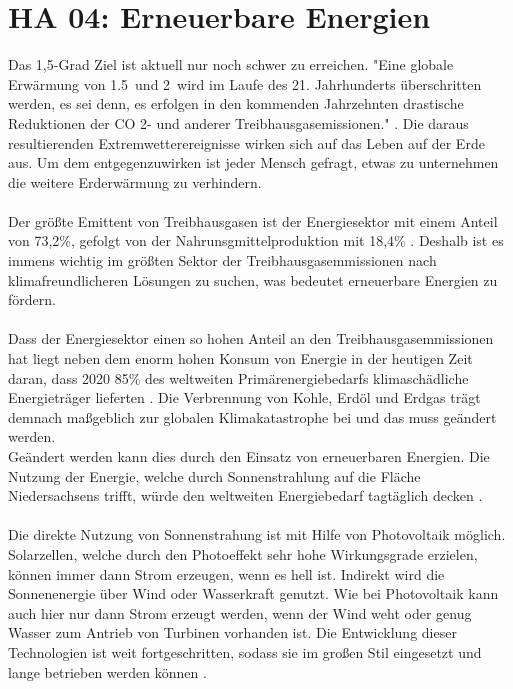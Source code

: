\section{HA 04: Erneuerbare Energien} \label{ha04}
  Das 1,5-Grad Ziel ist aktuell nur noch schwer zu erreichen. "Eine globale Erwärmung von 1.5\textcelsius\ und 2\textcelsius\ wird im Laufe des 21. Jahrhunderts überschritten werden, es sei denn, es erfolgen in den kommenden Jahrzehnten drastische Reduktionen der CO 2- und anderer Treibhausgasemissionen." \cite{ipcc_climate_2021}. Die daraus resultierenden Extremwetterereignisse wirken sich auf das Leben auf der Erde aus. Um dem entgegenzuwirken ist jeder Mensch gefragt, etwas zu unternehmen die weitere Erderwärmung zu verhindern.\\\\
  Der größte Emittent von Treibhausgasen ist der Energiesektor mit einem Anteil von 73,2\%, gefolgt von der Nahrunsgmittelproduktion mit 18,4\% \cite{ritchie_co2_2020}. Deshalb ist es immens wichtig im größten Sektor der Treibhausgasemmissionen nach klimafreundlicheren Lösungen zu suchen, was bedeutet erneuerbare Energien zu fördern.\\\\
  Dass der Energiesektor einen so hohen Anteil an den Treibhausgasemmissionen hat liegt neben dem enorm hohen Konsum von Energie in der heutigen Zeit daran, dass 2020 85\% des weltweiten Primärenergiebedarfs klimaschädliche Energieträger lieferten \cite{quaschning_regenerative_2019}. Die Verbrennung von Kohle, Erdöl und Erdgas trägt demnach maßgeblich zur globalen Klimakatastrophe bei und das muss geändert werden.\\
  Geändert werden kann dies durch den Einsatz von erneuerbaren Energien. Die Nutzung der Energie, welche durch Sonnenstrahlung auf die Fläche Niedersachsens trifft, würde den weltweiten Energiebedarf tagtäglich decken \cite{quaschning_regenerative_2019}.\\\\
  Die direkte Nutzung von Sonnenstrahung ist mit Hilfe von Photovoltaik möglich. Solarzellen, welche durch den Photoeffekt sehr hohe Wirkungsgrade erzielen, können immer dann Strom erzeugen, wenn es hell ist. Indirekt wird die Sonnenenergie über Wind oder Wasserkraft genutzt. Wie bei Photovoltaik kann auch hier nur dann Strom erzeugt werden, wenn der Wind weht oder genug Wasser zum Antrieb von Turbinen vorhanden ist. Die Entwicklung dieser Technologien ist weit fortgeschritten, sodass sie im großen Stil eingesetzt und lange betrieben werden können \cite{quaschning_regenerative_2019}.\\\\
